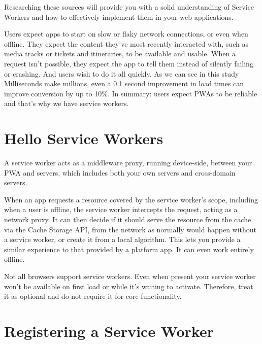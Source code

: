 \documentclass{article}
\begin{document}

Researching these sources will provide you with a solid understanding of Service Workers and how to effectively implement them in your web applications.




Users expect apps to start on slow or flaky network connections, or even when offline. They expect the content they've most recently interacted with, such as media tracks or tickets and itineraries, to be available and usable. When a request isn't possible, they expect the app to tell them instead of silently failing or crashing. And users wish to do it all quickly. As we can see in this study Milliseconds make millions, even a 0.1 second improvement in load times can improve conversion by up to 10\%. In summary: users expect PWAs to be reliable and that's why we have service workers.

\section*{Hello Service Workers}

A service worker acts as a middleware proxy, running device-side, between your PWA and servers, which includes both your own servers and cross-domain servers.

When an app requests a resource covered by the service worker's scope, including when a user is offline, the service worker intercepts the request, acting as a network proxy. It can then decide if it should serve the resource from the cache via the Cache Storage API, from the network as normally would happen without a service worker, or create it from a local algorithm. This lets you provide a similar experience to that provided by a platform app. It can even work entirely offline.

Not all browsers support service workers. Even when present your service worker won't be available on first load or while it's waiting to activate. Therefore, treat it as optional and do not require it for core functionality.

\section*{Registering a Service Worker}
\end{document}
